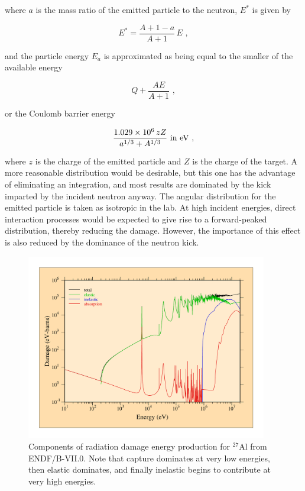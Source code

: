 \noindent
where $a$ is the mass ratio of the emitted particle to the neutron,
$E^*$ is given by

\begin{equation}
   E^*=\frac{A+1-a}{A+1}\,E\,\,,
\end{equation}
\vspace{1 pt}

\noindent
and the particle energy $E_a$ is approximated as being equal
to the smaller of the available energy

\begin{equation}
   Q+\frac{AE}{A+1}\,\,,
\end{equation}
\vspace{1 pt}

\noindent
or the Coulomb barrier energy

\begin{equation}
   \frac{1.029\times10^6\,zZ}{a^{1/3}+A^{1/3}}\,\,
      \hbox{\rm in eV}\,\,,
\end{equation}
\vspace{1 pt}

\noindent
where $z$ is the charge of the emitted particle and $Z$ is
the charge of the target.  A more reasonable distribution would
be desirable\cite{alb}, but this one has the advantage of
eliminating an integration, and most results are dominated by
the kick imparted by the incident neutron anyway.  The angular
distribution for the emitted particle is taken as isotropic
in the lab.  At high incident energies, direct interaction
processes would be expected to give rise to a forward-peaked
distribution, thereby reducing the
damage.  However, the
importance of this effect is also reduced by the dominance
of the neutron kick.

\begin{figure}[tp]\centering
\includegraphics[keepaspectratio,height=3.2in, angle=0]{figs/heatr3ack}
\caption[Components of radiation damage energy production for $^{27}$Al]
{Components of radiation damage energy production
for $^{27}$Al from ENDF/B-VII.0.  Note that capture dominates at
very low energies, then elastic dominates, and finally inelastic
begins to contribute at very high energies.}
\label{f3}
\end{figure}

